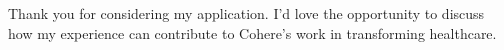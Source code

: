 \documentclass[11pt, letterpaper]{awesome-cv}
\begin{document}
\begin{cvletter}
Thank you for considering my application. I’d love the opportunity to discuss how my experience can contribute to Cohere’s work in transforming healthcare.


\end{cvletter}



\end{document}
